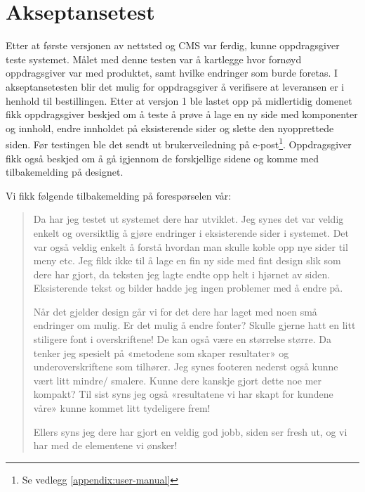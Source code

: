 \section{Akseptansetest}
Etter at første versjonen av nettsted og CMS var ferdig, kunne oppdragsgiver teste systemet. Målet med denne testen var å kartlegge hvor fornøyd oppdragsgiver var med produktet, samt hvilke endringer som burde foretas. I akseptansetesten blir det mulig for oppdragsgiver å verifisere at leveransen er i henhold til bestillingen. 
Etter at versjon 1 ble lastet opp på midlertidig domenet fikk oppdragsgiver beskjed om å teste å prøve å lage en ny side med komponenter og innhold, endre innholdet på eksisterende sider og slette den nyopprettede siden. Før testingen ble det sendt ut brukerveiledning på e-post\footnote{Se vedlegg \ref{appendix:user-manual}}. Oppdragsgiver fikk også beskjed om å gå igjennom de forskjellige sidene og komme med tilbakemelding på designet. 

Vi fikk følgende tilbakemelding på forespørselen vår: 

\begin{quote}
Da har jeg testet ut systemet dere har utviklet. Jeg synes det var veldig enkelt og oversiktlig å gjøre endringer i eksisterende sider i systemet. Det var også veldig enkelt å forstå hvordan man skulle koble opp nye sider til meny etc. Jeg fikk ikke til å lage en fin ny side med fint design slik som dere har gjort, da teksten jeg lagte endte opp helt i hjørnet av siden. Eksisterende tekst og bilder hadde jeg ingen problemer med å endre på.

Når det gjelder design går vi for det dere har laget med noen små endringer om mulig. Er det mulig å endre fonter? Skulle gjerne hatt en litt stiligere font i overskriftene! De kan også være en størrelse større. Da tenker jeg spesielt på «metodene som skaper resultater» og underoverskriftene som tilhører. Jeg synes footeren nederst også kunne vært litt mindre/ smalere. Kunne dere kanskje gjort dette noe mer kompakt? Til sist syns jeg også «resultatene vi har skapt for kundene våre» kunne kommet litt tydeligere frem!

Ellers syns jeg dere har gjort en veldig god jobb, siden ser fresh ut, og vi har med de elementene vi ønsker!
\end{quote}

